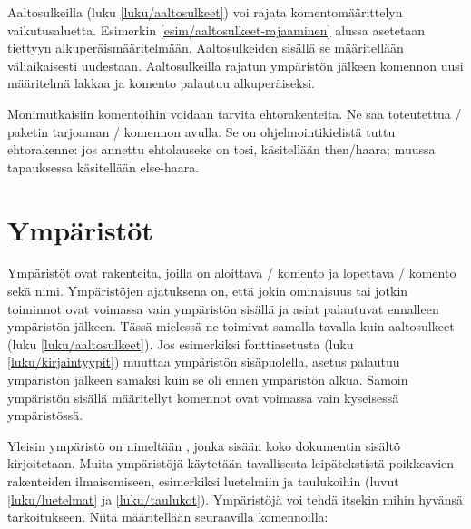 \noindent
Aaltosulkeilla (luku \ref{luku/aaltosulkeet}) voi rajata
komentomäärittelyn vaikutusaluetta. Esimerkin
\ref{esim/aaltosulkeet-rajaaminen} alussa asetetaan 
tiettyyn alkuperäismääritelmään. Aaltosulkeiden sisällä se määritellään
väliaikaisesti uudestaan. Aaltosulkeilla rajatun ympäristön jälkeen
komennon uusi määritelmä lakkaa ja komento palautuu alkuperäiseksi.

Monimutkaisiin komentoihin voidaan tarvita ehtorakenteita. Ne saa
toteutettua \-/ paketin tarjoaman
\-/ komennon avulla. Se on ohjelmointikielistä
tuttu ehtorakenne: jos annettu ehtolauseke on tosi, käsitellään
then\-/haara; muussa tapauksessa käsitellään else-haara.

\section{Ympäristöt}
\label{luku/ympäristöt}

Ympäristöt ovat rakenteita, joilla on aloittava \-/
komento ja lopettava \-/ komento sekä nimi. Ympäristöjen
ajatuksena on, että jokin ominaisuus tai jotkin toiminnot ovat voimassa
vain ympäristön sisällä ja asiat palautuvat ennalleen ympäristön
jälkeen. Tässä mielessä ne toimivat samalla tavalla kuin aaltosulkeet
(luku \ref{luku/aaltosulkeet}). Jos esimerkiksi fonttiasetusta (luku
\ref{luku/kirjaintyypit}) muuttaa ympäristön sisäpuolella, asetus
palautuu ympäristön jälkeen samaksi kuin se oli ennen ympäristön alkua.
Samoin ympäristön sisällä määritellyt komennot ovat voimassa vain
kyseisessä ympäristössä.

\begin{koodilohkosis}
\begin{nimi}
\end{nimi}
\end{koodilohkosis}

\noindent
Yleisin ympäristö on nimeltään , jonka sisään koko
dokumentin sisältö kirjoitetaan. Muita ympäristöjä käytetään
tavallisesta leipätekstistä poikkeavien rakenteiden ilmaisemiseen,
esimerkiksi luetelmiin ja taulukoihin (luvut \ref{luku/luetelmat} ja
\ref{luku/taulukot}). Ympäristöjä voi tehdä itsekin mihin hyvänsä
tarkoitukseen. Niitä määritellään seuraavilla komennoilla:

\begin{koodilohkosis}
\newenvironment   {nimi}[n][oletus]{aloitus}{lopetus}
\renewenvironment {nimi}[n][oletus]{aloitus}{lopetus}
\end{koodilohkosis}

